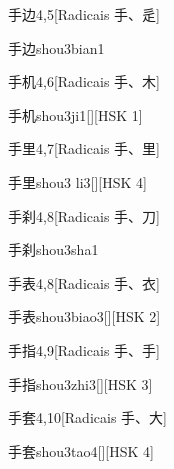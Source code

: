 \begin{entry}{手边}{4,5}[Radicais ⼿、⾡]
  \begin{phonetics}{手边}{shou3bian1}
  \end{phonetics}
\end{entry}

\begin{entry}{手机}{4,6}[Radicais ⼿、⽊]
  \begin{phonetics}{手机}{shou3ji1}[][HSK 1]
  \end{phonetics}
\end{entry}

\begin{entry}{手里}{4,7}[Radicais ⼿、⾥]
  \begin{phonetics}{手里}{shou3 li3}[][HSK 4]
  \end{phonetics}
\end{entry}

\begin{entry}{手刹}{4,8}[Radicais ⼿、⼑]
  \begin{phonetics}{手刹}{shou3sha1}
  \end{phonetics}
\end{entry}

\begin{entry}{手表}{4,8}[Radicais ⼿、⾐]
  \begin{phonetics}{手表}{shou3biao3}[][HSK 2]
  \end{phonetics}
\end{entry}

\begin{entry}{手指}{4,9}[Radicais ⼿、⼿]
  \begin{phonetics}{手指}{shou3zhi3}[][HSK 3]
  \end{phonetics}
\end{entry}

\begin{entry}{手套}{4,10}[Radicais ⼿、⼤]
  \begin{phonetics}{手套}{shou3tao4}[][HSK 4]
  \end{phonetics}
\end{entry}

